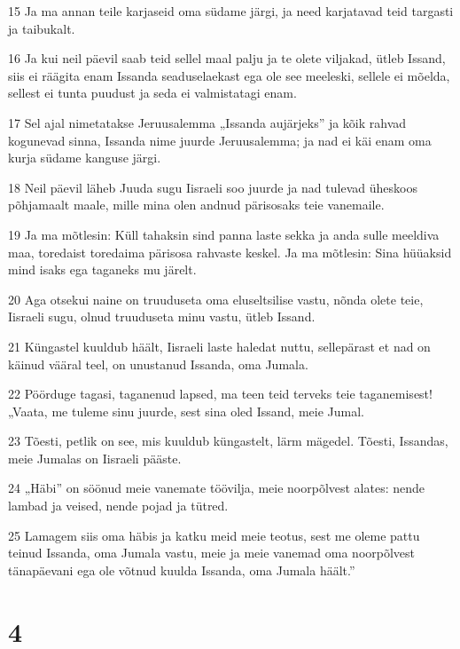 \par 15 Ja ma annan teile karjaseid oma südame järgi, ja need karjatavad teid targasti ja taibukalt.
\par 16 Ja kui neil päevil saab teid sellel maal palju ja te olete viljakad, ütleb Issand, siis ei räägita enam Issanda seaduselaekast ega ole see meeleski, sellele ei mõelda, sellest ei tunta puudust ja seda ei valmistatagi enam.
\par 17 Sel ajal nimetatakse Jeruusalemma „Issanda aujärjeks” ja kõik rahvad kogunevad sinna, Issanda nime juurde Jeruusalemma; ja nad ei käi enam oma kurja südame kanguse järgi.
\par 18 Neil päevil läheb Juuda sugu Iisraeli soo juurde ja nad tulevad üheskoos põhjamaalt maale, mille mina olen andnud pärisosaks teie vanemaile.
\par 19 Ja ma mõtlesin: Küll tahaksin sind panna laste sekka ja anda sulle meeldiva maa, toredaist toredaima pärisosa rahvaste keskel. Ja ma mõtlesin: Sina hüüaksid mind isaks ega taganeks mu järelt.
\par 20 Aga otsekui naine on truuduseta oma eluseltsilise vastu, nõnda olete teie, Iisraeli sugu, olnud truuduseta minu vastu, ütleb Issand.
\par 21 Küngastel kuuldub häält, Iisraeli laste haledat nuttu, sellepärast et nad on käinud vääral teel, on unustanud Issanda, oma Jumala.
\par 22 Pöörduge tagasi, taganenud lapsed, ma teen teid terveks teie taganemisest! „Vaata, me tuleme sinu juurde, sest sina oled Issand, meie Jumal.
\par 23 Tõesti, petlik on see, mis kuuldub küngastelt, lärm mägedel. Tõesti, Issandas, meie Jumalas on Iisraeli pääste.
\par 24 „Häbi” on söönud meie vanemate töövilja, meie noorpõlvest alates: nende lambad ja veised, nende pojad ja tütred.
\par 25 Lamagem siis oma häbis ja katku meid meie teotus, sest me oleme pattu teinud Issanda, oma Jumala vastu, meie ja meie vanemad oma noorpõlvest tänapäevani ega ole võtnud kuulda Issanda, oma Jumala häält.”

\chapter{4}

